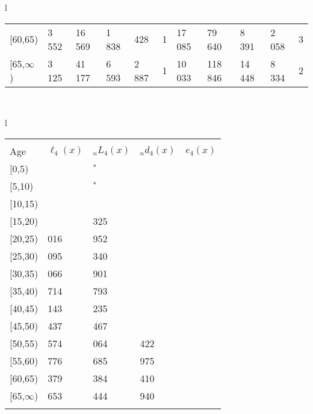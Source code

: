 \documentclass[
]{article}
\begin{document}
\begin{table}
\begin{tabular}[t]{l}
\begin{tabular}
{}[60,65) & 3 552 & 16 569 & 1 838 & 428 & 1 & 17 085 & 79 640 & 8 391 & 2 058 & 3\\
{}[65,$\infty$) & 3 125 & 41 177 & 6 593 & 2 887 & 1 & 10 033 & 118 846 & 14 448 & 8 334 & 2\\
\end{tabular}\\
\end{tabular}
\centering
\begin{tabular}[t]{l}
\hline
\begin{tabular}{>{\raggedright\arraybackslash}p{.43in}>{\raggedleft\arraybackslash}p{1.3in}>{\raggedleft\arraybackslash}p{1.3in}>{\raggedleft\arraybackslash}p{1.3in}>{\raggedleft\arraybackslash}p{1.3in}}
\toprule
\multicolumn{1}{c}{ } & \multicolumn{4}{c}{(4) Lost both} \\
\cmidrule(l{3pt}r{3pt}){2-5}
Age & $\ell_{4}(x)$ & ${}_nL_{4}(x)$ & ${}_nd_{4}(x)$ & $e_{4}(x)$\\
\midrule
{}[0,5) & 0 & 18$^{*}$ & 0 & 15\\
{}[5,10) & 18 & 145$^{*}$ & 0 & 15\\
{}[10,15) & 78 & 845 & 0 & 15\\
{}[15,20) & 302 & 3 325 & 6 & 15\\
{}[20,25) & 1 016 & 6 952 & 22 & 15\\
\addlinespace
{}[25,30) & 2 095 & 15 340 & 51 & 15\\
{}[30,35) & 3 066 & 23 901 & 95 & 15\\
{}[35,40) & 4 714 & 36 793 & 179 & 15\\
{}[40,45) & 7 143 & 56 235 & 341 & 15\\
{}[45,50) & 10 437 & 83 467 & 681 & 15\\
\addlinespace
{}[50,55) & 15 574 & 124 064 & 1 422 & 15\\
{}[55,60) & 24 776 & 173 685 & 2 975 & 14\\
{}[60,65) & 32 379 & 209 384 & 5 410 & 13\\
{}[65,$\infty$) & 37 653 & 726 444 & 50 940 & 11\\
\bottomrule
\multicolumn{5}{l}{\rule{0pt}{1em}\textsuperscript{*} Based on an estimated from SIPP with less than 10 respondents in the numerator.}\\
\end{tabular}\\
\end{tabular}
\end{table}
\end{document}
